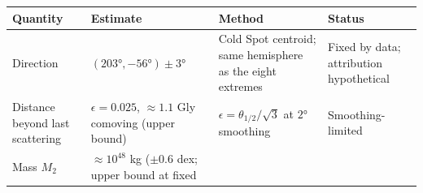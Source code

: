 \documentclass[
]{article}
\begin{document}
\begin{longtable}[]{@{}llll@{}}
\toprule
\begin{minipage}[b]{0.22\columnwidth}\raggedright
Quantity\strut
\end{minipage} & \begin{minipage}[b]{0.22\columnwidth}\raggedright
Estimate\strut
\end{minipage} & \begin{minipage}[b]{0.22\columnwidth}\raggedright
Method\strut
\end{minipage} & \begin{minipage}[b]{0.22\columnwidth}\raggedright
Status\strut
\end{minipage}\tabularnewline
\midrule
\endhead
\begin{minipage}[t]{0.22\columnwidth}\raggedright
Direction\strut
\end{minipage} & \begin{minipage}[t]{0.22\columnwidth}\raggedright
\((203°, -56°) \pm 3°\)\strut
\end{minipage} & \begin{minipage}[t]{0.22\columnwidth}\raggedright
Cold Spot centroid; same hemisphere as the eight extremes\strut
\end{minipage} & \begin{minipage}[t]{0.22\columnwidth}\raggedright
Fixed by data; attribution hypothetical\strut
\end{minipage}\tabularnewline
\begin{minipage}[t]{0.22\columnwidth}\raggedright
Distance beyond last scattering\strut
\end{minipage} & \begin{minipage}[t]{0.22\columnwidth}\raggedright
\(\epsilon = 0.025\), \(\approx 1.1\) Gly comoving (upper bound)\strut
\end{minipage} & \begin{minipage}[t]{0.22\columnwidth}\raggedright
\(\epsilon = \theta_{1/2}/\sqrt{3}\) at \(2°\) smoothing\strut
\end{minipage} & \begin{minipage}[t]{0.22\columnwidth}\raggedright
Smoothing-limited\strut
\end{minipage}\tabularnewline
\begin{minipage}[t]{0.22\columnwidth}\raggedright
Mass \(M_2\)\strut
\end{minipage} & \begin{minipage}[t]{0.22\columnwidth}\raggedright
\(\approx 10^{48}\) kg (\(\pm 0.6\) dex; upper bound at fixed

\end{minipage}
\end{longtable}
\end{document}
